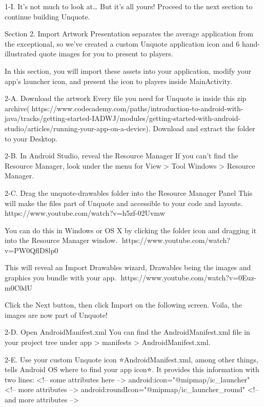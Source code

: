         1-I. It’s not much to look at…
                But it’s all yours! Proceed to the next section to continue building Unquote.

Section 2. Import Artwork
                Presentation separates the average application from the exceptional, so we’ve created a custom Unquote application icon and 6 hand-illustrated quote images for you to present to players.

                In this section, you will import these assets into your application, modify your app’s launcher icon, and present the icon to players inside MainActivity.

        2-A. Download the artwork
                Every file you need for Unquote is inside this zip archive(🔗https://www.codecademy.com/paths/introduction-to-android-with-java/tracks/getting-started-IADWJ/modules/getting-started-with-android-studio/articles/running-your-app-on-a-device). Download and extract the folder to your Desktop.

        2-B. In Android Studio, reveal the Resource Manager
                If you can’t find the Resource Manager, look under the menu for View > Tool Windows > Resource Manager.

        2-C. Drag the unquote-drawables folder into the Resource Manager Panel
                This will make the files part of Unquote and accessible to your code and layouts.
                        🎦https://www.youtube.com/watch?v=h5zf-02Uvmw

                You can do this in Windows or OS X by clicking the folder icon and dragging it into the Resource Manager window.
                        🎦https://www.youtube.com/watch?v=PW0QflD8lp0

                This will reveal an Import Drawables wizard, Drawables being the images and graphics you bundle with your app.
                        🎦https://www.youtube.com/watch?v=0Euz-m0C0dU

                Click the Next button, then click Import on the following screen. Voila, the images are now part of Unquote!

        2-D. Open AndroidManifest.xml
                You can find the AndroidManifest.xml file in your project tree under app > manifests > AndroidManifest.xml.

        2-E. Use your custom Unquote icon
                ⭐AndroidManifest.xml, among other things, tells Android OS where to find your app icon⭐. It provides this information with two lines:
                        <!-- some attributes here -->
                        android:icon="@mipmap/ic_launcher"
                        <!-- more attributes -->
                        android:roundIcon="@mipmap/ic_launcher_round"
                        <!-- and more attributes -->


